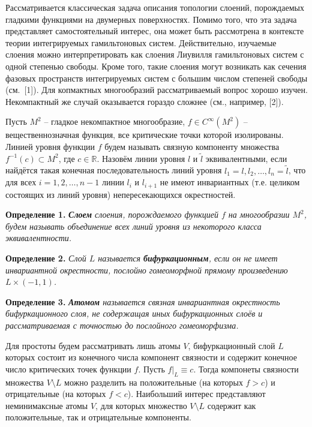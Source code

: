 


\vzmscaption

Рассматривается классическая задача описания топологии слоений, порождаемых гладкими функциями на двумерных поверхностях. Помимо того, что эта задача представляет самостоятельный интерес, она может быть рассмотрена в контексте теории интегрируемых гамильтоновых систем. Действительно, изучаемые слоения можно интерпретировать как слоения Лиувилля гамильтоновых систем с одной степенью свободы. Кроме того, такие слоения могут возникать как сечения фазовых пространств интегрируемых систем с большим числом степеней свободы (см.~[1]). Для копмактных многообразий рассматриваемый вопрос хорошо изучен. Некомпактный же случай оказывается гораздо сложнее (см., например, [2]).

Пусть $M^2$ -- гладкое некомпактное многообразие, $f\in C^\infty(M^2)$ -- вещественнозначная функция, все критические точки которой изолированы. Линией уровня функции $f$ будем называть связную компоненту множества $f^{-1}(c)\subset M^2$, где $c\in\mathbb R$. Назовём линии уровня $l$ и $\tilde l$ эквивалентными, если найдётся такая конечная последовательность линий уровня $l_1=l,l_2,\ldots,l_n=\tilde l$, что для всех $i=1,2,\ldots,n-1$ линии $l_i$ и $l_{i+1}$ не имеют инвариантных (т.е. целиком состоящих из линий уровня) непересекающихся окрестностей. %

\textbf{Определение 1.}
{\it \textbf{Слоем} слоения, порождаемого функцией $f$ на многообразии $M^2$, будем называть объединение всех линий уровня из некоторого класса эквивалентности.}

\textbf{Определение 2.}
{\it Слой $L$ называется \textbf{бифуркационным}, если он не имеет инвариантной окрестности, послойно гомеоморфной прямому произведению $L\times(-1,1)$.}

\textbf{Определение 3.}
{\it \textbf{Атомом} называется связная инвариантная окрестность бифуркационного слоя, не содержащая иных бифуркационных слоёв и рассматриваемая с точностью до послойного гомеоморфизма.}

Для простоты будем рассматривать лишь атомы $V$, бифуркационный слой $L$ которых состоит из конечного числа компонент связности и содержит конечное число критических точек функции $f$. Пусть $f|_L\equiv c$. Тогда компонеты связности множества $V\setminus L$ можно разделить на положительные (на которых $f>c$) и отрицательные (на которых $f<c$). Наибольший интерес представляют неминимаксные атомы $V$, для которых множество $V\setminus L$ содержит как положительные, так и отрицательные компоненты.


